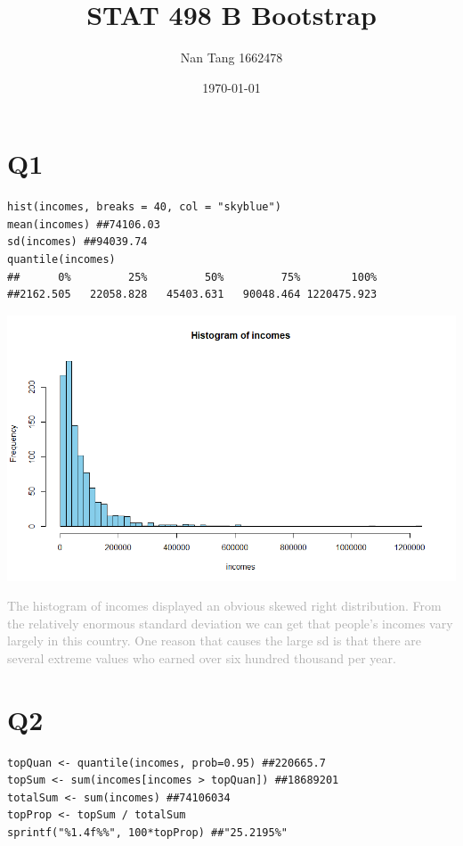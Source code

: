 \documentclass[12pt]{article}
\begin{document}
\title{STAT 498 B Bootstrap}
\author{Nan Tang 1662478}
\date{\today}
\maketitle

\section*{Q1}
\begin{verbatim}
hist(incomes, breaks = 40, col = "skyblue")
mean(incomes) ##74106.03
sd(incomes) ##94039.74
quantile(incomes)
##      0%         25%         50%         75%        100% 
##2162.505   22058.828   45403.631   90048.464 1220475.923 
\end{verbatim}

\includegraphics[width = 6.5 in]{Hist-incomes.png}

\noindent \textcolor{darkgray}{The histogram of incomes displayed an obvious skewed right distribution. From the relatively enormous standard deviation we can get that people's incomes vary largely in this country. One reason that causes the large sd is that there are several extreme values who earned over six hundred thousand per year.}

\section*{Q2}
\begin{verbatim}
topQuan <- quantile(incomes, prob=0.95) ##220665.7 
topSum <- sum(incomes[incomes > topQuan]) ##18689201
totalSum <- sum(incomes) ##74106034
topProp <- topSum / totalSum 
sprintf("%1.4f%%", 100*topProp) ##"25.2195%"
\end{verbatim}
\end{document}
